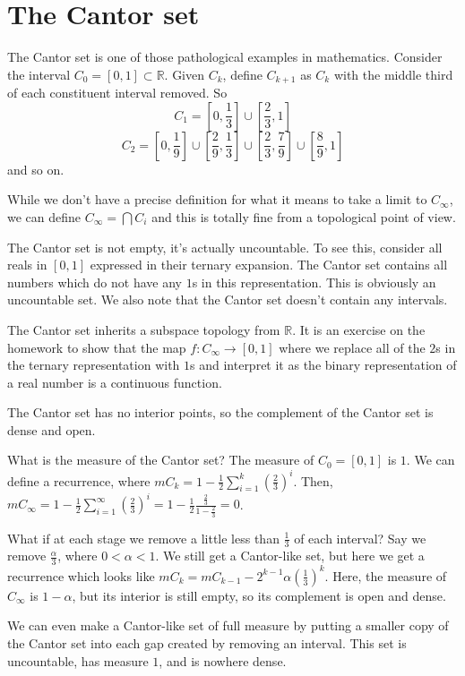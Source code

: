 
\section*{The Cantor set}

The Cantor set is one of those pathological examples in mathematics.  Consider the interval $C_0=[0,1]\subset\mathbb{R}$.  Given $C_k$, define $C_{k+1}$ as $C_k$ with the middle third of each constituent interval removed.  So $$C_1=[0,\frac{1}{3}]\cup[\frac{2}{3},1]$$ $$C_2=[0,\frac{1}{9}]\cup[\frac{2}{9},\frac{1}{3}]\cup[\frac{2}{3},\frac{7}{9}]\cup[\frac{8}{9},1]$$ and so on.

While we don't have a precise definition for what it means to take a limit to $C_\infty$, we can define $C_\infty=\bigcap C_i$ and this is totally fine from a topological point of view.




The Cantor set is not empty, it's actually uncountable.  To see this, consider all reals in $[0,1]$ expressed in their ternary expansion.  The Cantor set contains all numbers which do not have any $1$s in this representation.  This is obviously an uncountable set.  We also note that the Cantor set doesn't contain any intervals.  

The Cantor set inherits a subspace topology from $\mathbb{R}$.  It is an exercise on the homework to show that the map $f:C_\infty \rightarrow [0,1]$ where we replace all of the $2$s in the ternary representation with $1$s and interpret it as the binary representation of a real number is a continuous function.

The Cantor set has no interior points, so the complement of the Cantor set is dense and open.


What is the measure of the Cantor set?  The measure of $C_0=[0,1]$ is $1$.  We can define a recurrence, where $mC_k=1-\frac{1}{2}\sum\limits_{i=1}^{k}(\frac{2}{3})^i$.  Then, $mC_\infty = 1-\frac{1}{2}\sum\limits_{i=1}^{\infty}(\frac{2}{3})^i = 1-\frac{1}{2}\frac{\frac{2}{3}}{1-\frac{2}{3}}=0$.

What if at each stage we remove a little less than $\frac{1}{3}$ of each interval?  Say we remove $\frac{\alpha}{3}$, where $0<\alpha<1$.  We still get a Cantor-like set, but here we get a recurrence which looks like $mC_k=mC_{k-1}-2^{k-1}\alpha(\frac{1}{3})^k$.  Here, the measure of $C_\infty$ is $1-\alpha$, but its interior is still empty, so its complement is open and dense.

We can even make a Cantor-like set of full measure by putting a smaller copy of the Cantor set into each gap created by removing an interval.  This set is uncountable, has measure $1$, and is nowhere dense.